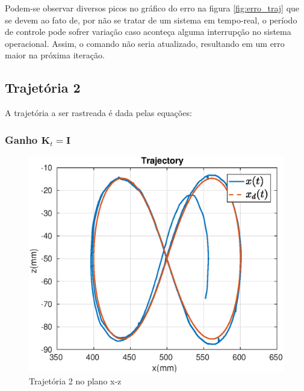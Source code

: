 Podem-se observar diversos picos no gráfico do erro na figura \ref{fig:erro_traj} que se devem ao fato de, por não se tratar de um sistema em tempo-real, o período de controle pode sofrer variação caso aconteça alguma interrupção no sistema operacional. Assim, o comando não seria atualizado, resultando em um erro maior na próxima iteração.


\subsection{Trajetória 2}
A trajetória a ser rastreada é dada pelas equações:

\subsubsection{Ganho $\bm{K}_t = \bm{I}$}
\begin{figure}[H]
\centering
  \includegraphics[width=0.5\linewidth]{./img/traj_2_k1/traj.eps}
  \caption{Trajetória 2 no plano x-z}
  \label{fig:sub1}
\end{figure}%

